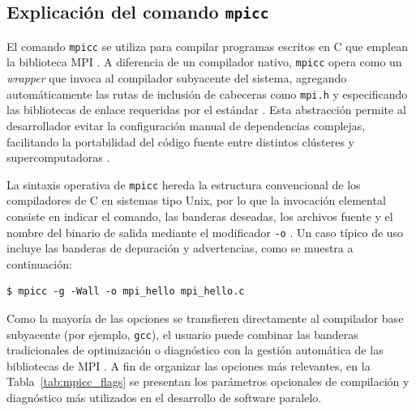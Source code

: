 \subsection{Explicación del comando \texttt{mpicc}}

El comando \texttt{mpicc} se utiliza para compilar programas escritos en C que emplean la biblioteca MPI \cite{pacheco_2011}. A diferencia de un compilador nativo, \texttt{mpicc} opera como un \textit{wrapper} que invoca al compilador subyacente del sistema, agregando automáticamente las rutas de inclusión de cabeceras como \texttt{mpi.h} y especificando las bibliotecas de enlace requeridas por el estándar \cite{pacheco_2011, mpi_forum_2025}. Esta abstracción permite al desarrollador evitar la configuración manual de dependencias complejas, facilitando la portabilidad del código fuente entre distintos clústeres y supercomputadoras \cite{grama_intro_parallel_2003}.

La sintaxis operativa de \texttt{mpicc} hereda la estructura convencional de los compiladores de C en sistemas tipo Unix, por lo que la invocación elemental consiste en indicar el comando, las banderas deseadas, los archivos fuente y el nombre del binario de salida mediante el modificador \texttt{-o} \cite{pacheco_2011}. Un caso típico de uso incluye las banderas de depuración y advertencias, como se muestra a continuación:

\begin{verbatim}
$ mpicc -g -Wall -o mpi_hello mpi_hello.c
\end{verbatim}

Como la mayoría de las opciones se transfieren directamente al compilador base subyacente (por ejemplo, \texttt{gcc}), el usuario puede combinar las banderas tradicionales de optimización o diagnóstico con la gestión automática de las bibliotecas de MPI \cite{pacheco_2011}. A fin de organizar las opciones más relevantes, en la Tabla~\ref{tab:mpicc_flags} se presentan los parámetros opcionales de compilación y diagnóstico más utilizados en el desarrollo de software paralelo.

